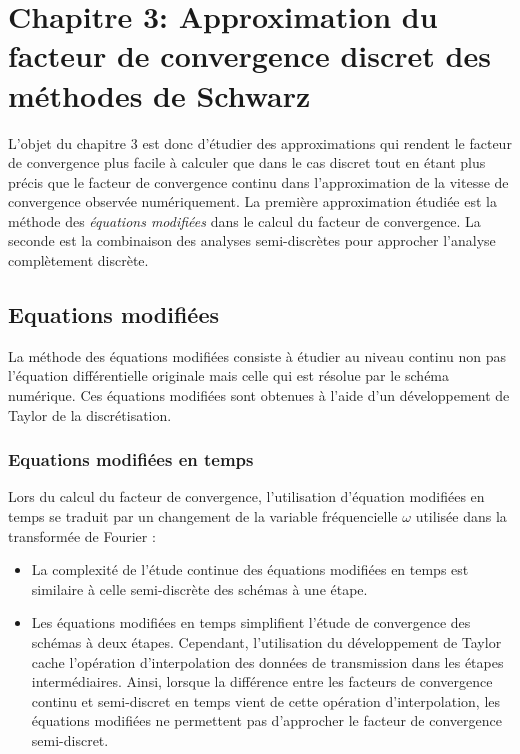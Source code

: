 \section*{Chapitre 3: Approximation du facteur de convergence discret des méthodes de Schwarz}
 L'objet du chapitre 3 est donc d'étudier des approximations
qui rendent le facteur de convergence plus facile à calculer
que dans le cas discret tout en étant plus précis que le facteur
de convergence continu dans l'approximation de la vitesse
de convergence observée numériquement.
La première approximation étudiée est la méthode des
\textit{équations modifiées} dans le calcul du facteur de convergence.
La seconde est la combinaison des analyses semi-discrètes
pour approcher l'analyse complètement discrète.
\subsection*{Equations modifiées}
La méthode des équations modifiées consiste à étudier au niveau
continu non pas l'équation différentielle originale mais celle
qui est résolue par le schéma numérique.
Ces équations modifiées sont obtenues à l'aide d'un développement
de Taylor de la discrétisation.
\subsubsection*{Equations modifiées en temps}
Lors du calcul du facteur de convergence, l'utilisation d'équation
modifiées en temps se traduit par un changement de la variable
fréquencielle $\omega$ utilisée dans la transformée de Fourier :
\begin{itemize}
	\item
La complexité de l'étude continue des équations modifiées en temps
est similaire à celle semi-discrète des schémas à une étape.
	\item
Les équations modifiées en temps simplifient l'étude de convergence
des schémas à deux étapes. Cependant, l'utilisation du développement
de Taylor cache l'opération d'interpolation des données de
transmission dans les étapes intermédiaires. Ainsi, lorsque la
différence entre les facteurs de convergence continu
et semi-discret en temps vient de cette opération d'interpolation,
les équations modifiées ne permettent pas d'approcher le facteur
de convergence semi-discret.
\end{itemize}
